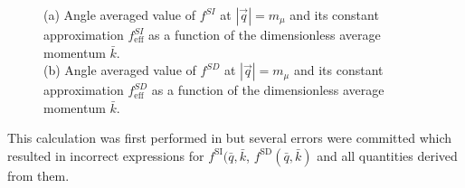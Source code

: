 \documentclass{book}[12pt]
\begin{document}
\begin{figure}
\centering
{}
\hfill
{}
\caption{(a) Angle averaged value of $f^{SI}$ at $|\vec{q}|=m_{\mu}$ and its constant approximation $f_\mathrm{eff}^{SI}$ as a function of the dimensionless average momentum $\bar{k}$. 
\\
(b) Angle averaged value of $f^{SD}$ at $|\vec{q}|=m_{\mu}$ and its constant approximation $f_\mathrm{eff}^{SD}$ as a function of the dimensionless average momentum $\bar{k}$.}
\label{fig:1body_f_functions}
\end{figure}


This calculation was first performed in \cite{2018PhRvC..98a5208B} but several errors were committed which resulted in incorrect expressions for $f^\mathrm{SI}(\bar{q},\bar{k}$, $f^\mathrm{SD}(\bar{q},\bar{k})$ and all quantities derived from them.
\end{document}
